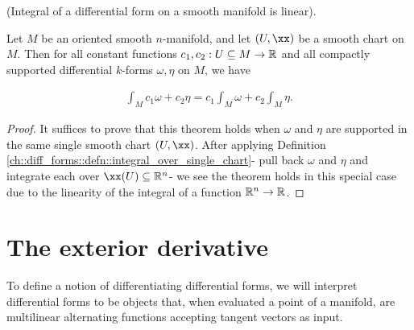 \begin{theorem}
    (Integral of a differential form on a smooth manifold is linear).
    
    Let $M$ be an oriented smooth $n$-manifold, and let $(U, \xx)$ be a smooth chart on $M$. Then for all constant functions $c_1, c_2:U \subseteq M \rightarrow \mathbb{R}$ and all compactly supported differential $k$-forms $\omega, \eta$ on $M$, we have
    
    \begin{align*}
        \int_M c_1 \omega + c_2 \eta = c_1 \int_M \omega + c_2 \int_M \eta.
    \end{align*}
\end{theorem}

\begin{proof}
    It suffices to prove that this theorem holds when $\omega$ and $\eta$ are supported in the same single smooth chart $(U, \xx)$. After applying Definition \ref{ch::diff_forms::defn::integral_over_single_chart}- pull back $\omega$ and $\eta$ and integrate each over $\xx(U) \subseteq \R^n$- we see the theorem holds in this special case due to the linearity of the integral of a function $\mathbb{R}^n \rightarrow \mathbb{R}$.
\end{proof}

\newpage

\section{The exterior derivative}

To define a notion of differentiating differential forms, we will interpret differential forms to be objects that, when evaluated a point of a manifold, are multilinear alternating functions accepting tangent vectors as input.

